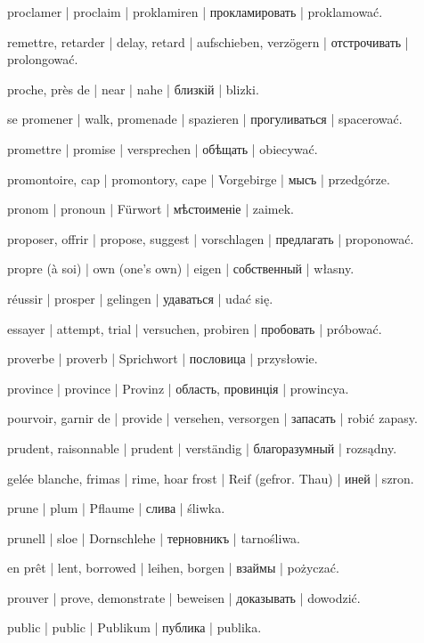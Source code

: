 \begin{outdent}{1em}
proclamer | proclaim | proklamiren | прокламировать | proklamować.

remettre, retarder | delay, retard | aufschieben,
verzögern | отстрочивать | prolongować.

proche, près de | near | nahe | близкій | blizki.

se promener | walk, promenade | spazieren | прогуливаться | spacerować.

promettre | promise | versprechen | обѣщать | obiecywać.

promontoire, cap | promontory, cape | Vorgebirge | мысъ | przedgórze.

pronom | pronoun | Fürwort | мѣстоименіе | zaimek.

proposer, offrir | propose, suggest | vorschlagen | предлагать | proponować.

propre (à soi) | own (one’s own) | eigen | собственный | własny.

réussir | prosper | gelingen | удаваться | udać się.

essayer | attempt, trial | versuchen, probiren | пробовать | próbować.

proverbe | proverb | Sprichwort | пословица | przysłowie.

province | province | Provinz | область, провинція | prowincya.

pourvoir, garnir de | provide | versehen, versorgen | запасать | robić zapasy.

prudent, raisonnable | prudent | verständig | благоразумный | rozsądny.

gelée blanche, frimas | rime, hoar frost | Reif
(gefror. Thau) | иней | szron.

prune | plum | Pflaume | слива | śliwka.

prunell | sloe | Dornschlehe | терновникъ | tarnośliwa.

en prêt | lent, borrowed | leihen, borgen | взаймы | pożyczać.

prouver | prove, demonstrate | beweisen | доказывать | dowodzić.

public | public | Publikum | публика | publika.


\end{outdent}
